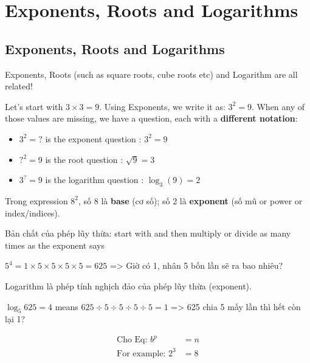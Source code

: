 \chapter{Exponents, Roots and Logarithms}

\section{Exponents, Roots and Logarithms}

Exponents, Roots (such as square roots, cube roots etc) and Logarithm are all related!

Let's start with $3\times 3=9$. Using Exponents, we write it as: $3^{2}=9$. When any of those values are missing, we have a question, each with a \textbf{different notation}:

\begin{itemize}
  \item $3^{2}=?$ is the exponent question : $3^{2}=9$
  \item $?^{2}=9$ is the root question : $\sqrt{9}=3$
  \item $3^{?}=9$ is the logarithm question : $\log_3 (9)=2$
\end{itemize}

\vspace{10 mm}

Trong expression \(8^{2}\), số 8 là \textbf{base} (cơ số); số 2 là \textbf{exponent} (số mũ or power or index/indices).

Bản chất của phép lũy thừa: start with  and then multiply or divide as many times as the exponent says

\(5^{4}= 1 \times 5 \times 5 \times 5 \times 5=625\) => Giờ có 1, nhân 5 bốn lần sẽ ra bao nhiêu?

Logarithm là phép tính nghịch đảo của phép lũy thừa (exponent).

\(\log_5 625=4\) means \(625 \div 5 \div 5 \div 5 \div 5=1\) => 625 chia 5 mấy lần thì hết còn lại 1?

\vspace{8 mm}

\begin{equation}
  \begin{split}
    \text{Cho Eq: } b^{p}&=n\\
    \text{For example: } 2^{3}&=8
  \end{split}
  \label{exponent_eqn}
\end{equation}

